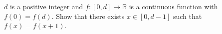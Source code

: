$d$ is a positive integer and $f : [0,d] \rightarrow \mathbb{R}$ is a continuous function with $f(0) = f(d)$. Show that there exists $x \in [0,d-1]$ such that $f(x) = f(x+1)$.